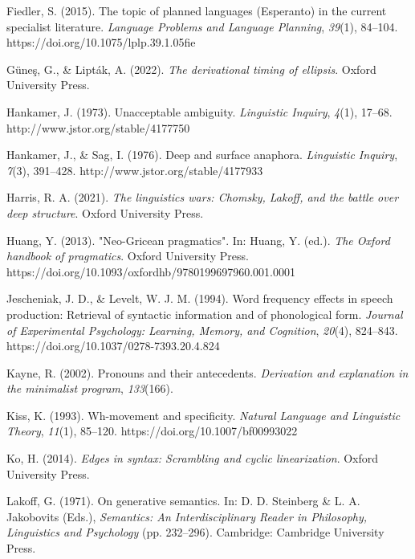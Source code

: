 \documentclass{article}
\begin{document}
\begin{thebibliography}{100}
     Fiedler, S. (2015). The topic of planned languages (Esperanto) in the current specialist literature. \textit{Language Problems and Language Planning}, \textit{39}(1), 84–104. https://doi.org/10.1075/lplp.39.1.05fie
    
    Güneş, G., \& Lipták, A. (2022). \textit{The derivational timing of ellipsis}. Oxford University Press.

    Hankamer, J. (1973). Unacceptable ambiguity. \textit{Linguistic Inquiry}, \textit{4}(1), 17–68. http://www.jstor.org/stable/4177750
    
    Hankamer, J., \& Sag, I. (1976). Deep and surface anaphora. \textit{Linguistic Inquiry}, \textit{7}(3), 391–428. http://www.jstor.org/stable/4177933
    
     Harris, R. A. (2021). \textit{The linguistics wars: Chomsky, Lakoff, and the battle over deep structure}. Oxford University Press.
    
    Huang, Y. (2013). "Neo-Gricean pragmatics". In: Huang, Y. (ed.). \textit{The Oxford handbook of pragmatics}. Oxford University Press.
    https://doi.org/10.1093/oxfordhb/9780199697960.001.0001
    
     Jescheniak, J. D., \& Levelt, W. J. M. (1994). Word frequency effects in speech production: Retrieval of syntactic information and of phonological form. \textit{Journal of Experimental Psychology: Learning, Memory, and Cognition}, \textit{20}(4), 824–843. https://doi.org/10.1037/0278-7393.20.4.824
    
    Kayne, R. (2002). Pronouns and their antecedents. \textit{Derivation and explanation in the minimalist program}, \textit{133}(166).
    
     Kiss, K. (1993). Wh-movement and specificity. \textit{Natural Language and Linguistic Theory}, \textit{11}(1), 85–120. https://doi.org/10.1007/bf00993022
    
     Ko, H. (2014). \textit{Edges in syntax: Scrambling and cyclic linearization}. Oxford University Press.
    
     Lakoff, G. (1971). On generative semantics. In: D. D. Steinberg \& L. A. Jakobovits (Eds.), \textit{Semantics: An Interdisciplinary Reader in Philosophy, Linguistics and Psychology} (pp. 232–296). Cambridge: Cambridge University Press.


\end{thebibliography}
\end{document}

